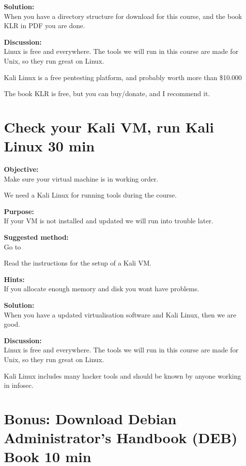 \documentclass[a4paper,11pt,notitlepage]{report}
\begin{document}
{\bf Solution:}\\
When you have a directory structure for download for this course, and the book KLR in PDF you are done.

{\bf Discussion:}\\
Linux is free and everywhere. The tools we will run in this course are made for Unix, so they run great on Linux.

Kali Linux is a free pentesting platform, and probably worth more than \$10.000

The book KLR is free, but you can buy/donate, and I recommend it.

\chapter{Check your Kali VM, run Kali Linux 30 min}
\label{ex:basicKaliVM}


{\bf Objective:}\\
Make sure your virtual machine is in working order.

We need a Kali Linux for running tools during the course.

{\bf Purpose:}\\
If your VM is not installed and updated we will run into trouble later.

{\bf Suggested method:}\\
Go to 

Read the instructions for the setup of a Kali VM.

{\bf Hints:}\\
If you allocate enough memory and disk you wont have problems.

{\bf Solution:}\\
When you have a updated virtualisation software and Kali Linux, then we are good.

{\bf Discussion:}\\
Linux is free and everywhere. The tools we will run in this course are made for Unix, so they run great on Linux.

Kali Linux includes many hacker tools and should be known by anyone working in infosec.


\chapter{Bonus: Download Debian Administrator’s Handbook (DEB) Book 10 min}
\label{ex:sw-downloadDEB}
\end{document}
